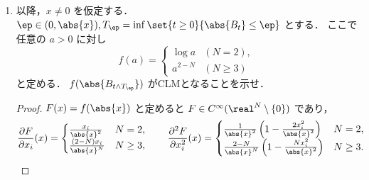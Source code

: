 \documentclass{jsarticle}
\begin{document}
\begin{enumerate}
    \item
    以降，$x\neq0$ を仮定する．
    $\ep\in(0,\abs{x}),T_{\ep}=\inf\set{t\ge0}{\abs{B_t}\le\ep}$ とする．
    ここで任意の $a>0$ に対し
    $$
    f(a)=
    \begin{cases}
        \log a & (N=2), \\
        a^{2-N} & (N\ge3)
    \end{cases}
    $$
    と定める．
    $f(\abs{B_{t\wedge T_{\ep}}})$ がCLMとなることを示せ．
    \begin{proof}
        $F(x)=f(\abs{x})$ と定めると $F\in C^\infty(\real^N\setminus\{0\})$ であり，
        $$
        \frac{\partial F}{\partial x_i}(x)=
        \begin{cases}
            \frac{x_i}{\abs{x}^2} & N=2, \\
            \frac{(2-N)x_i}{\abs{x}^N} & N\ge3,
        \end{cases}\qquad
        \frac{\partial^2 F}{\partial x_i^2}(x)=
        \begin{cases}
            \frac{1}{\abs{x}^2}\left(1-\frac{2x_i^2}{\abs{x}^2}\right) & N=2, \\
            \frac{2-N}{\abs{x}^N}\left(1-\frac{Nx_i^2}{\abs{x}^2}\right) & N\ge3.
        \end{cases}
        $$


\end{proof}
\end{enumerate}
\end{document}
